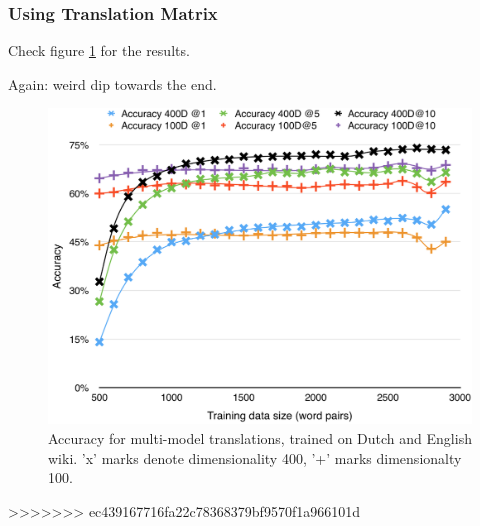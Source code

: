 \subsubsection{Using Translation Matrix}
Check figure \ref{fig:accuracy_single_model_wikis} for the results.

Again: weird dip towards the end. 

\begin{figure}[ht!]
  \centering \includegraphics[width=\linewidth]{images/accuracy_single_model_wikis}
  \caption{Accuracy for multi-model translations, trained on Dutch and English wiki. 'x' marks denote dimensionality 400, '+' marks dimensionalty 100.}
  \label{fig:accuracy_single_model_wikis}
\end{figure}
>>>>>>> ec439167716fa22c78368379bf9570f1a966101d
